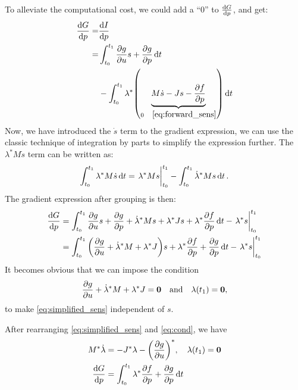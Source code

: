 \documentclass[a4paper,9pt,twocolumn]{article}
\theoremstyle{definition}
\theoremstyle{remark}
\begin{document}
To alleviate the computational cost, we could add a ``$0$'' to $\dv{G}{p}$, and
get:
\begin{align}
  \dv{G}{p} = &\dv{I}{p} \\
  = &\int_{t_0}^{t_1} \pdv{g}{u}s + \pdv{g}{p} \dd{t} \\
  &-\int_{t_0}^{t_1} \lambda^*\qty(\underbrace{M\dot{s} -
  Js - \pdv{f}{p}}_{0 \quad\cref{eq:forward_sens}}) \dd{t}
\end{align}
Now, we have introduced the $\dot{s}$ term to the gradient expression, we can
use the classic technique of integration by parts to simplify the expression
further. The $\lambda^* M\dot{s}$ term can be written as:
\begin{align}
  \int_{t_0}^{t_1} \lambda^* M\dot{s} \dd{t} = \eval{\lambda^* Ms}_{t_0}^{t_1} -
  \int_{t_0}^{t_1} \dot{\lambda}^* Ms \dd{t}.
\end{align}
The gradient expression after grouping is then:
\begin{align} \label{eq:simplified_sens}
  \dv{G}{p} &= \int_{t_0}^{t_1} \pdv{g}{u}s + \pdv{g}{p}
  + \dot{\lambda}^* Ms + \lambda^* Js+ \lambda^* \pdv{f}{p} \dd{t}
              - \eval{\lambda^* s}_{t_0}^{t_1} \nonumber \\
            &= \int_{t_0}^{t_1} \qty(\pdv{g}{u} + \dot{\lambda}^*M  + \lambda^* J)s
              +\lambda^* \pdv{f}{p}  + \pdv{g}{p} \dd{t}
              - \eval{\lambda^* s}_{t_0}^{t_1}
\end{align}
It becomes obvious that we can impose the condition
\begin{equation} \label{eq:cond}
  \pdv{g}{u} + \dot{\lambda}^*M + \lambda^* J = \bm{0} \qq{and}
  \lambda(t_1) = \bm{0},
\end{equation}
to make \cref{eq:simplified_sens} independent of $s$.

After rearranging \cref{eq:simplified_sens} and \cref{eq:cond}, we have
\begin{align}
  M^*\dot{\lambda} &= -J^* \lambda - \qty(\pdv{g}{u})^*, \quad \lambda(t_1) = \bm{0} \\
  \dv{G}{p} &= \int_{t_0}^{t_1} \lambda^* \pdv{f}{p}  + \pdv{g}{p} \dd{t}
\end{align}
\end{document}
